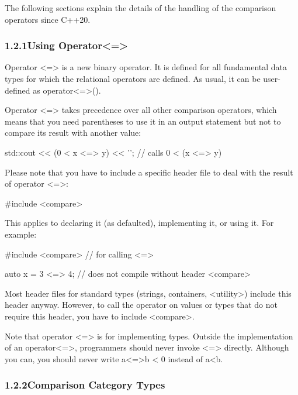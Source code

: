 The following sections explain the details of the handling of the comparison operators since C++20.

\subsubsection*{ 1.2.1\hspace{0.2cm}Using Operator<=>}

Operator <=> is a new binary operator. It is defined for all fundamental data types for which the relational operators are defined. As usual, it can be user-defined as operator<=>().

Operator <=> takes precedence over all other comparison operators, which means that you need parentheses to use it in an output statement but not to compare its result with another value:

\begin{cpp}
std::cout << (0 < x <=> y) << '\n'; // calls 0 < (x <=> y)
\end{cpp}

Please note that you have to include a specific header file to deal with the result of operator <=>:

\begin{cpp}
#include <compare>
\end{cpp}

This applies to declaring it (as defaulted), implementing it, or using it. For example:

\begin{cpp}
#include <compare> // for calling <=>

auto x = 3 <=> 4; // does not compile without header <compare>
\end{cpp}

Most header files for standard types (strings, containers, <utility>) include this header anyway. However, to call the operator on values or types that do not require this header, you have to include <compare>.

Note that operator <=> is for implementing types. Outside the implementation of an operator<=>, programmers should never invoke <=> directly. Although you can, you should never write a<=>b < 0 instead of a<b.

\subsubsection*{ 1.2.2\hspace{0.2cm}Comparison Category Types}

